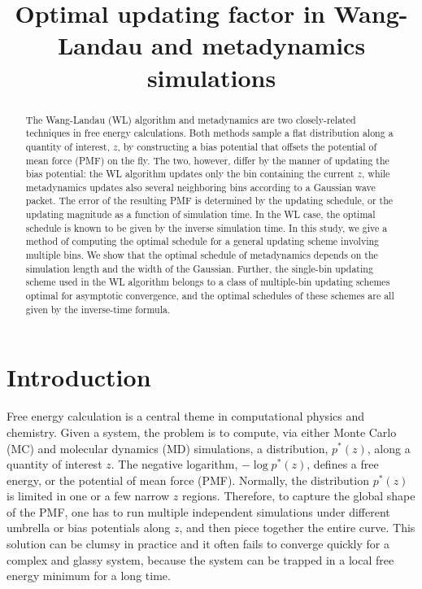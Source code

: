 \documentclass[reprint, floatfix]{revtex4-1}
\begin{document}
\title{Optimal updating factor in Wang-Landau and metadynamics simulations}



\begin{abstract}
  The Wang-Landau (WL) algorithm and metadynamics
  are two closely-related techniques
  in free energy calculations.
  Both methods sample a flat distribution
  along a quantity of interest, $z$,
  by constructing a bias potential that offsets
  the potential of mean force (PMF) on the fly.
  The two, however, differ by
  the manner of updating the bias potential:
  the WL algorithm updates only
  the bin containing the current $z$,
  while metadynamics updates also
  several neighboring bins according to
  a Gaussian wave packet.
  The error of the resulting PMF
  is determined by the updating schedule,
  or the updating magnitude
  as a function of simulation time.
  In the WL case,
  the optimal schedule
  is known to be given by
  the inverse simulation time.
  In this study,
  we give a method of computing the optimal schedule
  for a general updating scheme
  involving multiple bins.
  We show that the optimal schedule of metadynamics
  depends on the simulation length
  and the width of the Gaussian.
  Further,
  the single-bin updating scheme
  used in the WL algorithm
  belongs to a class of multiple-bin updating schemes
  optimal for asymptotic convergence,
  and the optimal schedules of these schemes
  are all given by the inverse-time formula.
\end{abstract}

\maketitle



\section{Introduction}



Free energy calculation\cite{frenkel, newman} is a central theme
in computational physics and chemistry.
%
Given a system,
the problem is to compute,
via either Monte Carlo\cite{frenkel, newman, landau_binder} (MC)
and molecular dynamics\cite{frenkel, karplus2002} (MD) simulations,
a distribution, $p^*(z)$,
along a quantity of interest $z$.
%
The negative logarithm,
$-\log p^*(z)$,
defines a free energy,
or the potential of mean force (PMF).
%
Normally, the distribution $p^*(z)$ is
limited in one or a few narrow $z$ regions.
%
Therefore, to capture the global shape
of the PMF,
one has to run multiple independent simulations
under different umbrella or bias potentials
along $z$\cite{mezei1987, berg1992, lee1993},
and then piece together the entire curve.
%
This solution can be clumsy in practice
and it often fails to converge quickly
for a complex and glassy system,
because the system can be trapped
in a local free energy minimum
for a long time.
\end{document}
